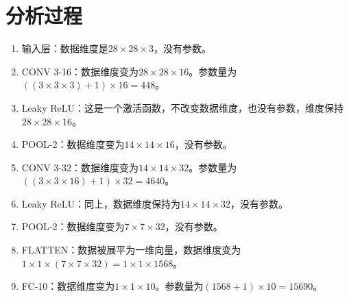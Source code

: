 \section{分析过程}\label{sec:process}

\begin{enumerate}
  \item 输入层：数据维度是$28 \times 28 \times 3$，没有参数。
  \item CONV 3-16：数据维度变为$28 \times 28 \times 16$。参数量为$((3 \times 3 \times 3)+1) \times 16 = 448$。
  \item Leaky ReLU：这是一个激活函数，不改变数据维度，也没有参数，维度保持$28 \times 28 \times 16$。
  \item POOL-2：数据维度变为$14 \times 14 \times 16$，没有参数。
  \item CONV 3-32：数据维度变为$14 \times 14 \times 32$。参数量为$((3 \times 3 \times 16)+1) \times 32 = 4640$。
  \item Leaky ReLU：同上，数据维度保持为$14 \times 14 \times 32$，没有参数。
  \item POOL-2：数据维度变为$7 \times 7 \times 32$，没有参数。
  \item FLATTEN：数据被展平为一维向量，数据维度变为$1 \times 1 \times (7 \times 7 \times 32) = 1 \times 1 \times 1568$。
  \item FC-10：数据维度变为$1 \times 1 \times 10$。参数量为$(1568+1) \times 10 = 15690$。
\end{enumerate}